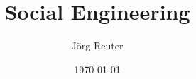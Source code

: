 \documentclass{beamer}
\begin{document}
\title{Social Engineering} 
\author{Jörg Reuter}
\date{\today} 

\frame{\titlepage} 

\end{document}
